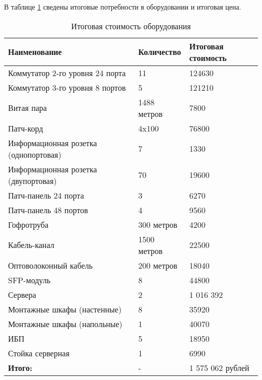 В таблице \ref{table:hwfinalcosts} сведены итоговые потребности в оборудовании и итоговая цена.

\begin{table}[!htbp]
  \centering
  \begin{tabular}{|l|l|l|}%
    \hline
    Наименование & Количество & Итоговая стоимость \\ \hline
    Коммутатор 2-го уровня 24 порта & 11 & 124630 \\ \hline
    Коммутатор 3-го уровня 8 портов & 5 & 121210 \\ \hline
    Витая пара & 1488 метров & 7800 \\ \hline
    Патч-корд & 4x100 & 76800 \\ \hline
    Информационная розетка (однопортовая) & 7 & 1330 \\ \hline
    Информационная розетка (двупортовая) & 70 & 19600 \\ \hline
    Патч-панель 24 порта & 3 & 6270\\ \hline
    Патч-панель 48 портов & 4 & 9560\\ \hline
    Гофротруба & 300 метров & 4200 \\ \hline
    Кабель-канал & 1500 метров & 22500 \\ \hline
    Оптоволоконный кабель & 200 метров & 18040 \\ \hline
    SFP-модуль & 8 & 44800 \\ \hline
    Сервера & 2 & 1 016 392\\ \hline
    Монтажные шкафы (настенные) & 8 & 35920 \\ \hline
    Монтажные шкафы (напольные) & 1 & 40070 \\ \hline
    ИБП & 5 & 18950 \\ \hline
    Стойка серверная & 1 & 6990 \\ \hline
    \textbf{Итого:} & - & 1 575 062 рублей\\ \hline
  \end{tabular}
  \caption{Итоговая стоимость оборудования}
  \label{table:hwfinalcosts}
\end{table}